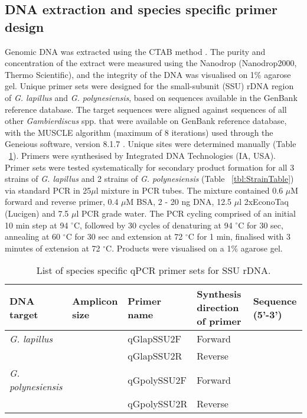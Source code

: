 \documentclass[12pt]{article}
\begin{document}
\subsection*{DNA extraction and species specific primer design}
Genomic DNA was extracted using the CTAB method \citep{zhou1999analysis}. The purity and concentration of the extract were measured using the Nanodrop (Nanodrop2000, Thermo Scientific), and the integrity of the DNA was visualised on 1\% agarose gel.
Unique primer sets were designed for the small-subunit (SSU) rDNA region of \emph{G. lapillus} and \emph{G. polynesiensis}, based on sequences available in the GenBank reference database. The target sequences were aligned against sequences of all other \emph{Gambierdiscus} spp. that were available on GenBank reference database, with the MUSCLE algorithm (maximum of 8 iterations) \citep{edgar2004muscle} used through the Geneious software, version 8.1.7 \citep{kearse2012geneious}. Unique sites were determined manually (Table ~\ref{tbl:PrimerTable}). Primers were synthesised by Integrated DNA Technologies (IA, USA).
Primer sets were tested systematically for secondary product formation for all 3 strains of \emph{G. lapillus} and 2 strains of \emph{G. polynesiensis} (Table ~\ref{tbl:StrainTable}) via standard PCR in 25$\mu$l mixture in PCR tubes. The mixture contained 0.6 $\mu$M forward and reverse primer, 0.4 $\mu$M BSA, 2 - 20 ng DNA, 12.5 $\mu$l 2xEconoTaq (Lucigen) and 7.5 $\mu$l PCR grade water.
The PCR cycling comprised of an initial 10 min step at 94 $^{\circ}$C, followed by 30 cycles of denaturing at 94 $^{\circ}$C for 30 sec, annealing at 60 $^{\circ}$C for 30 sec and extension at 72 $^{\circ}$C for 1 min, finalised with 3 minutes of extension at 72 $^{\circ}$C. Products were visualised on a 1\% agarose gel.
\FloatBarrier
\begin{table}
\caption{List of species specific qPCR primer sets for SSU rDNA.}
\label{tbl:PrimerTable}
\begin{tabular}{ | p{2cm} | p{2cm} | p{2cm} | p{2cm} | p{7cm} | }
\hline
\textbf{DNA target} & \textbf{Amplicon size} & \textbf{Primer name} & \textbf{Synthesis direction of primer} & \textbf{Sequence (5'-3')} \\
\hline
\emph{G. lapillus} & &qGlapSSU2F & Forward & \\
\hline
& &qGlapSSU2R & Reverse & \\
\hline
\emph{G. polynesiensis}& &qGpolySSU2F& Forward & \\
\hline
& &qGpolySSU2R & Reverse & \\
\hline
\end{tabular}
\end{table}
\end{document}
